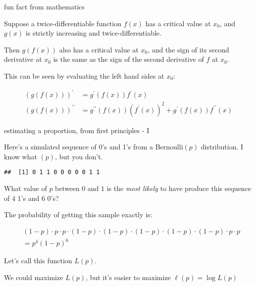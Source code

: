 \documentclass[ignorenonframetext,aspectratio=169]{beamer}
\begin{document}
\begin{frame}{fun fact from mathematics}

Suppose a twice-differentiable function \(f(x)\) has a critical value at
\(x_0\), and \(g(x)\) is strictly increasing and twice-differentiable.

Then \(g(f(x))\) also has a critical value at \(x_0\), and the sign of
its second derivative at \(x_0\) is the same as the sign of the second
derivative of \(f\) at \(x_0\).

This can be seen by evaluating the left hand sides at \(x_0\):

\begin{align*}
(g(f(x)))^{\prime} &= g^{\prime}(f(x))f^{\prime}(x)\\
(g(f(x)))^{\prime\prime} &= g^{\prime\prime}(f(x))(f^{\prime}(x))^2 + g^{\prime}(f(x))f^{\prime\prime}(x)
\end{align*}

\end{frame}

\begin{frame}[fragile]{estimating a proportion, from first principles -
I}

Here's a simulated sequence of 0's and 1's from a Bernoulli\((p)\)
distribution. I know what \((p)\), but you don't.

\begin{verbatim}
##  [1] 0 1 1 0 0 0 0 0 1 1
\end{verbatim}

What value of \(p\) between \(0\) and \(1\) is the \textit{most likely}
to have produce this sequence of \(4\) 1's and \(6\) 0's?

\pause The probability of getting this sample exactly is:

\begin{align*}
& (1-p)\cdot p\cdot p\cdot (1-p)\cdot (1-p)\cdot (1-p)\cdot (1-p)\cdot (1-p)\cdot p\cdot p \\
&= p^4(1-p)^6
\end{align*}

Let's call this function \(L(p)\).

\pause We could maximize \(L(p)\), but it's easier to maximize
\(\ell(p) = \log{L(p)}\)

\end{frame}
\end{document}
